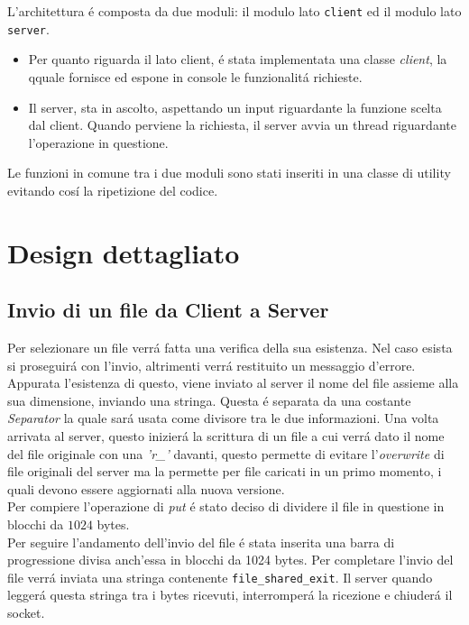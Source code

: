 \documentclass[a4paper, 12pt]{report}
\begin{document}
L'architettura é composta da due moduli: il modulo lato \texttt{client} ed il modulo lato \texttt{server}.
\begin{itemize}
    \item Per quanto riguarda il lato client, é stata implementata una classe \emph{client}, la qquale fornisce ed espone
    in console le funzionalitá richieste.
    \item Il server, sta in ascolto, aspettando un input riguardante la funzione scelta dal client.
    Quando perviene la richiesta, il server avvia un thread riguardante l'operazione in questione.
\end{itemize}
Le funzioni in comune tra i due moduli sono stati inseriti in una classe di utility evitando cosí la ripetizione del codice.

\section{Design dettagliato}
\subsection{Invio di un file da Client a Server} \label{clientToServer}
Per selezionare un file verrá fatta una verifica della sua esistenza. Nel caso esista si proseguirá
con l'invio, altrimenti verrá restituito un messaggio d'errore. Appurata l'esistenza di questo, viene inviato
al server il nome del file assieme alla sua dimensione, inviando una stringa. Questa é separata da una costante \emph{Separator}
la quale sará usata come divisore tra le due informazioni. Una volta arrivata al server, questo inizierá la scrittura
di un file a cui verrá dato il nome del file originale con una \emph{'r\_'} davanti, questo permette di evitare l'\emph{overwrite} di file
originali del server ma la permette per file caricati in un primo momento, i quali devono essere aggiornati alla nuova versione.
\\
Per compiere l'operazione di \emph{put} é stato deciso di dividere il file in questione in blocchi da \(1024\) bytes.
\\
Per seguire l'andamento dell'invio del file é stata inserita una barra di progressione divisa anch'essa in blocchi da 1024 bytes.
Per completare l'invio del file verrá inviata una stringa contenente \texttt{file\_shared\_exit}.
Il server quando leggerá questa stringa tra i bytes ricevuti, interromperá la ricezione e chiuderá il socket.
\end{document}
